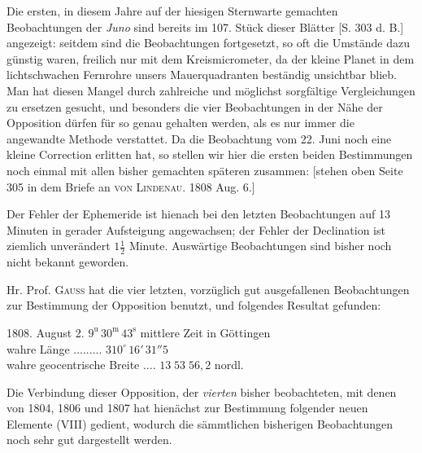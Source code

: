 \par\indent Die ersten, in diesem Jahre auf der hiesigen Sternwarte gemachten Beobachtungen der \emph{Juno} sind
bereits im 107. Stück dieser Blätter [S. 303 d. B.] angezeigt: seitdem sind die Beobachtungen fortgesetzt,
so oft die Umstände dazu günstig waren, freilich nur mit dem Kreismicrometer, da der kleine Planet
in dem lichtschwachen Fernrohre unsers Mauerquadranten beständig unsichtbar blieb. Man hat diesen
Mangel durch zahlreiche und möglichst sorgfältige Vergleichungen zu ersetzen gesucht, und besonders
die vier Beobachtungen in der Nähe der Opposition dürfen für so genau gehalten werden, als es nur
immer die angewandte Methode verstattet. Da die Beobachtung vom 22. Juni noch eine kleine Correction erlitten hat, so stellen wir hier die ersten beiden Bestimmungen noch einmal mit allen bisher
gemachten späteren zusammen: [stehen oben Seite 305 in dem Briefe an \textsc{von Lindenau}. 1808 Aug. 6.]

\par\indent Der Fehler der Ephemeride ist hienach bei den letzten Beobachtungen auf 13 Minuten in gerader Aufsteigung angewachsen; der Fehler der Declination ist ziemlich unverändert $1\frac{1}{2}$ Minute. Auswärtige Beobachtungen sind bisher noch nicht bekannt geworden.

\par\indent Hr. Prof. \textsc{Gauss} hat die vier letzten, vorzüglich gut ausgefallenen Beobachtungen zur Bestimmung der Opposition benutzt, und folgendes Resultat gefunden:

\begin{center}
1808. August 2. $9^{\text{u}}\,30^{\text{m}}\,43^{\text{s}}$ mittlere Zeit in Göttingen\\
wahre Länge .\;.\;.\;.\;.\;.\;.\;.\;.\; $310^\circ\,16'\,31''5$\\
wahre geocentrische Breite .\;.\;.\;.\; $13\;53\;56,2$ nordl.
\end{center}

\par\indent Die Verbindung dieser Opposition, der \emph{vierten} bisher beobachteten, mit denen von 1804, 1806 und
1807 hat hienächst zur Bestimmung folgender neuen Elemente (VIII) gedient, wodurch die sämmtlichen
bisherigen Beobachtungen noch sehr gut dargestellt werden.


